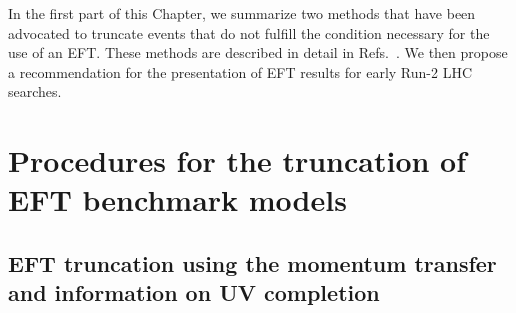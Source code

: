 In the first part of this Chapter, we summarize two methods that
have been advocated to truncate events that 
do not fulfill the condition necessary for the use of an EFT.
These methods are described in detail in Refs.~\cite{Busoni:2013lha,Busoni:2014sya,Busoni:2014haa,Aad:2015zva,Racco:2015dxa,Berlin:2014cfa}. 
We then propose a recommendation for the presentation of EFT results for early Run-2 LHC searches.

\section{Procedures for the truncation of EFT benchmark models}

\subsection{EFT truncation using the momentum transfer and information on UV completion}

\label{sec:TruncationWithQTr}

